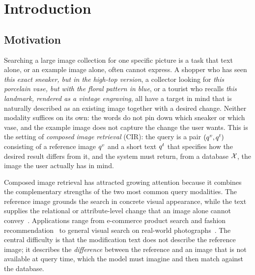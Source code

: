\chapter{Introduction}\label{chapt:intro}


\section{Motivation}\label{sect:intro_motivation}

Searching a large image collection for one specific picture is a task that
text alone, or an example image alone, often cannot express. A shopper who has
seen \emph{this exact sneaker, but in the high-top version}, a collector looking
for \emph{this porcelain vase, but with the floral pattern in blue}, or a tourist
who recalls \emph{this landmark, rendered as a vintage engraving}, all have a
target in mind that is naturally described as an existing image together with a
desired change. Neither modality suffices on its own: the words do not pin down
which sneaker or which vase, and the example image does not capture the change the
user wants. This
is the setting of \emph{composed image retrieval} (CIR): the query is a pair
$(q^{v}, q^{t})$ consisting of a reference image $q^{v}$ and a short text $q^{t}$ that
specifies how the desired result differs from it, and the system must return,
from a database $\mathcal{X}$, the image the user actually has in mind.

Composed image retrieval has attracted growing attention because it combines
the complementary strengths of the two most common query modalities. The
reference image grounds the search in concrete visual appearance, while the
text supplies the relational or attribute-level change that an image alone
cannot convey~\cite{vo2019tirg}. Applications range from e-commerce product
search and fashion recommendation~\cite{wu2021fashioniq} to general visual
search on real-world photographs~\cite{liu2021cirr}. The central difficulty is
that the modification text does not describe the reference image; it describes
the \emph{difference} between the reference and an image that is not available
at query time, which the model must imagine and then match against the
database.

